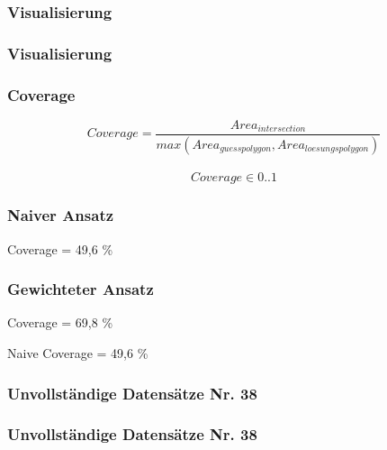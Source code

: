\begin{frame}
  \frametitle{Visualisierung}
\end{frame}

\begin{frame}
  \frametitle{Visualisierung}
\end{frame}

\begin{frame}
  \frametitle{Coverage}
  \begin{equation*}
    Coverage = \frac{Area_{intersection}}{max(Area_{guesspolygon},Area_{loesungspolygon})}
  \end{equation*}
\\
  \begin{equation*}
    Coverage \in {0..1}
  \end{equation*}
\end{frame}

\begin{frame}
  \frametitle{Naiver Ansatz}
  \begin{center}
  \huge{Coverage = 49,6 \%}
  \end{center}
\end{frame}

\begin{frame}
  \frametitle{Gewichteter Ansatz}
  \begin{center}
  \huge{Coverage = 69,8 \%}
  \end{center}
  \begin{center}
  Naive Coverage = 49,6 \%
  \end{center}
\end{frame}


\begin{frame}
  \frametitle{Unvollständige Datensätze \hfill Nr. 38}
\end{frame}


\begin{frame}
  \frametitle{Unvollständige Datensätze \hfill Nr. 38}
\end{frame}


